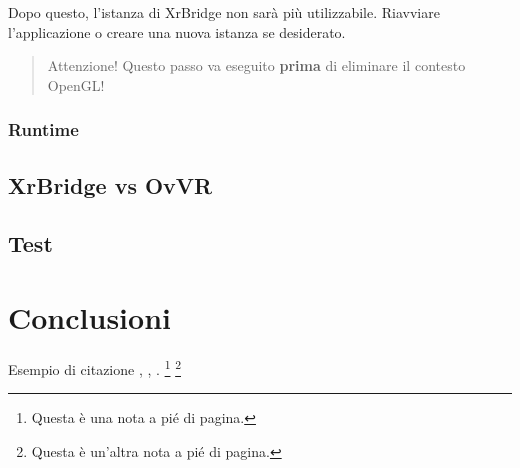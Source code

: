 \documentclass[twoside]{supsistudent}
\begin{document}
Dopo questo, l'istanza di XrBridge non sarà più utilizzabile. Riavviare l'applicazione o creare una nuova istanza se desiderato.

\begin{quote}
  Attenzione! Questo passo va eseguito \textbf{prima} di eliminare il contesto OpenGL!
\end{quote}


\subsection{Runtime}

\section{XrBridge vs OvVR}


\section{Test}

\chapter{Conclusioni}

\lipsum[23]
Esempio di citazione \cite{4538384}, \cite{5357331,4523385}, \cite{1705631}.
\footnote{Questa \`e una nota a pi\'e di pagina.}
\footnote{Questa \`e un'altra nota a pi\'e di pagina.}



\end{document}

